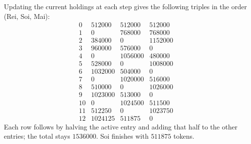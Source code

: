 Updating the current holdings at each step gives the following triples in the order (Rei, Soi, Mai):\[\begin{array}{c|rrr}0&512000&512000&512000\\1&0&768000&768000\\2&384000&0&1152000\\3&960000&576000&0\\4&0&1056000&480000\\5&528000&0&1008000\\6&1032000&504000&0\\7&0&1020000&516000\\8&510000&0&1026000\\9&1023000&513000&0\\10&0&1024500&511500\\11&512250&0&1023750\\12&1024125&511875&0\end{array}\]Each row follows by halving the active entry and adding that half to the other entries; the total stays $1536000$. Soi finishes with $\boxed{511875}$ tokens.

